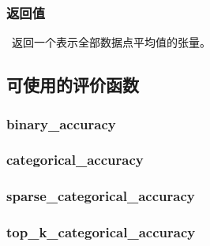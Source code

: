 \subsubsection{返回值}\label{ux8fd4ux56deux503c}

~返回一个表示全部数据点平均值的张量。



\subsection{可使用的评价函数}\label{ux53efux4f7fux7528ux7684ux8bc4ux4ef7ux51fdux6570}

\subsubsection{binary\_accuracy}\label{binaryux5faccuracy}

\begin{Shaded}
\begin{Highlighting}[]
\end{Highlighting}
\end{Shaded}

\subsubsection{categorical\_accuracy}\label{categoricalux5faccuracy}

\begin{Shaded}
\begin{Highlighting}[]
\end{Highlighting}
\end{Shaded}



\subsubsection{sparse\_categorical\_accuracy}\label{sparseux5fcategoricalux5faccuracy}

\begin{Shaded}
\begin{Highlighting}[]
\end{Highlighting}
\end{Shaded}



\subsubsection{top\_k\_categorical\_accuracy}\label{topux5fkux5fcategoricalux5faccuracy}

